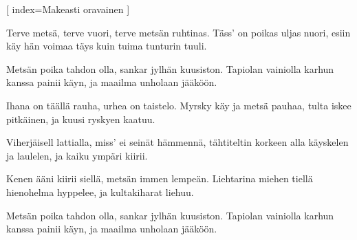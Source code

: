 [%
index={Makeasti oravainen}
]

\beginverse
Terve metsä, terve vuori,
terve metsän ruhtinas.
Täss' on poikas uljas nuori,
esiin käy hän voimaa täys
kuin tuima tunturin tuuli.
\endverse

\beginverse
Metsän poika tahdon olla,
sankar jylhän kuusiston.
Tapiolan vainiolla
karhun kanssa painii käyn,
ja maailma unholaan jääköön.
\endverse

\beginverse
Ihana on täällä rauha,
urhea on taistelo.
Myrsky käy ja metsä pauhaa,
tulta iskee pitkäinen,
ja kuusi ryskyen kaatuu.
\endverse

\beginverse
Viherjäisell lattialla,
miss' ei seinät hämmennä,
tähtiteltin korkeen alla
käyskelen ja laulelen,
ja kaiku ympäri kiirii.
\endverse

\beginverse
Kenen ääni kiirii siellä,
metsän immen lempeän.
Liehtarina miehen tiellä
hienohelma hyppelee,
ja kultakiharat liehuu.
\endverse

\beginverse
Metsän poika tahdon olla,
sankar jylhän kuusiston.
Tapiolan vainiolla
karhun kanssa painii käyn,
ja maailma unholaan jääköön.
\endverse

\endsong
